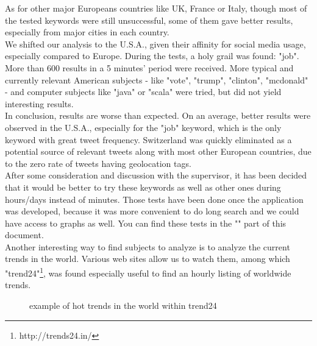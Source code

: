 \documentclass[a4paper,11pt]{report}
\begin{document}
As for other major Europeans countries like UK, France or Italy, though most of the tested keywords were still unsuccessful, some of them gave better results, especially from major cities in each country.\\

We shifted our analysis to the U.S.A., given their affinity for social media usage, especially compared to Europe. During the tests, a holy grail was found: "job". More than 600 results in a 5 minutes' period were received. More typical and currently relevant American subjects - like "vote", "trump", "clinton", "mcdonald" - and computer subjects like "java" or "scala" were tried, but did not yield interesting results.\\

In conclusion, results are worse than expected. On an average, better results were observed in the U.S.A., especially for the "job" keyword, which is the only keyword with great tweet frequency. Switzerland was quickly eliminated as a potential source of relevant tweets along with most other European countries, due to the zero rate of tweets having geolocation tags.\\

After some consideration and discussion with the supervisor, it has been decided that it would be better to try these keywords as well as other ones during hours/days instead of minutes. Those tests have been done once the application was developed, because it was more convenient to do long search and we could have access to graphs as well. You can find these tests in the "" part of this document.\\

Another interesting way to find subjects to analyze is to analyze the current trends in the world. Various web sites allow us to watch them, among which "trend24"\footnote{http://trends24.in/}, was found especially useful to find an hourly listing of worldwide trends.
\begin{figure}[H]
\vspace{-5pt}
\begin{center}
\vspace{-20pt}
\caption{example of hot trends in the world within trend24}
\end{center}
\end{figure}
\newpage
\end{document}
